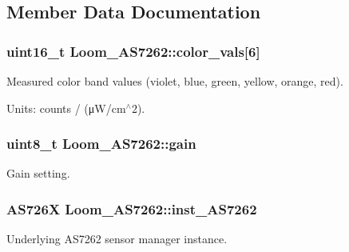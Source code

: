 \subsection{Member Data Documentation}
\subsubsection[{\texorpdfstring{color\+\_\+vals}{color_vals}}]{\setlength{\rightskip}{0pt plus 5cm}uint16\+\_\+t Loom\+\_\+\+A\+S7262\+::color\+\_\+vals\mbox{[}6\mbox{]}\hspace{0.3cm}{\ttfamily [protected]}}\hypertarget{class_loom___a_s7262_a951df5e3e0154cc32f79b3d4156109b7}{}\label{class_loom___a_s7262_a951df5e3e0154cc32f79b3d4156109b7}


Measured color band values (violet, blue, green, yellow, orange, red). 

Units\+: counts / (μ\+W/cm$^\wedge$2). 
\subsubsection[{\texorpdfstring{gain}{gain}}]{\setlength{\rightskip}{0pt plus 5cm}uint8\+\_\+t Loom\+\_\+\+A\+S7262\+::gain\hspace{0.3cm}{\ttfamily [protected]}}\hypertarget{class_loom___a_s7262_a3a9fc889a169e21181fa703ea152147d}{}\label{class_loom___a_s7262_a3a9fc889a169e21181fa703ea152147d}


Gain setting. 

\subsubsection[{\texorpdfstring{inst\+\_\+\+A\+S7262}{inst_AS7262}}]{\setlength{\rightskip}{0pt plus 5cm}A\+S726X Loom\+\_\+\+A\+S7262\+::inst\+\_\+\+A\+S7262\hspace{0.3cm}{\ttfamily [protected]}}\hypertarget{class_loom___a_s7262_a601df5126c5cf248fa51dace2596aa2f}{}\label{class_loom___a_s7262_a601df5126c5cf248fa51dace2596aa2f}


Underlying A\+S7262 sensor manager instance. 

